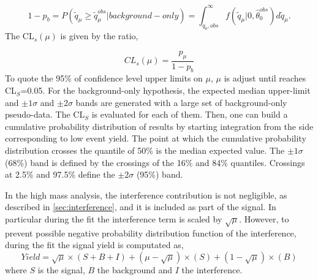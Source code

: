 \begin{equation}
 1- p_{b}= P( \tilde{q}_{\mu} \geq \tilde{q}_{\mu}^{obs} | background-only)=  \int_{ q_{0},obs }^{\infty } f(\tilde{q}_{\mu}| 0, \hat{\theta}_{0}^{obs}   ) d \tilde{q}_{\mu}.   \end{equation}
The CL$_{s}(\mu)$ is given by the ratio,

\begin{equation}
  CL_s(\mu)=\frac{p_{\mu}}{1-p_b}   \end{equation}
To quote the 95\% of confidence level upper limits on $\mu$, $\mu$ is adjust until reaches CL$_S$=0.05.
For the background-only hypothesis, the expected median upper-limit and $\pm 1 \sigma$ and $\pm 2 \sigma$ bands are generated with a large set   of background-only pseudo-data. The CL$_S$ is evaluated for each of them.
Then,  one can build a cumulative probability distribution of results by starting integration from the side corresponding to low event yield.
The point at which the cumulative probability distribution crosses the quantile of 50\% is the median expected value. 
The  $\pm 1 \sigma$ (68\%) band is defined by the crossings of the 16\% and 84\% quantiles.  Crossings at 2.5\% and 97.5\% define the  $\pm 2 \sigma$ (95\%) band.
\newline

In the high mass analysis,  the interference contribution is not negligible, as described in \ref{sec:interference}, and it is included as part of the signal. 
In particular during the fit the interference term is scaled by $\sqrt{\mu}$.
However, to prevent possible negative probability distribution function of the interference,  during the fit the signal yield is computated as,
\begin{equation}
Yield=\sqrt{\mu} \times (S+B+I)+ (\mu -\sqrt{\mu}) \times (S) + (1-\sqrt{\mu}) \times (B)
\end{equation}
where  $S$ is the signal, $B$ the background and $I$ the interference.

